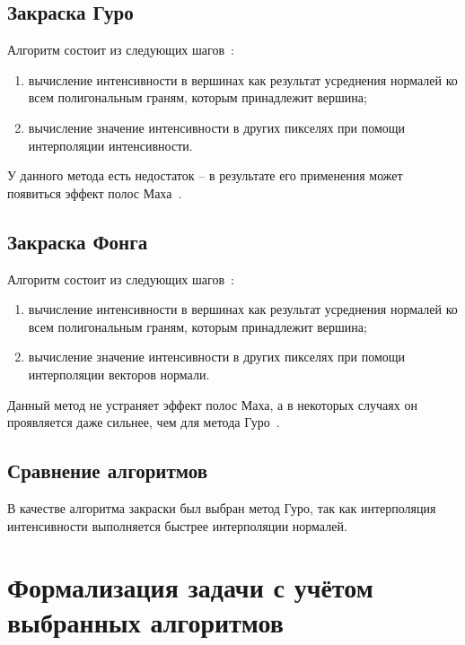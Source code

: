 \subsection{Закраска Гуро}

Алгоритм состоит из следующих шагов~\cite{gaf}:

\begin{enumerate}[label=\arabic*.]
	\item вычисление интенсивности в вершинах как результат усреднения нормалей ко всем полигональным граням, которым принадлежит вершина;
	\item вычисление значение интенсивности в других пикселях при помощи интерполяции интенсивности. 
\end{enumerate}

У данного метода есть недостаток -- в результате его применения может появиться эффект полос Маха~\cite{cannon}.

\subsection{Закраска Фонга}

Алгоритм состоит из следующих шагов~\cite{gaf}:

\begin{enumerate}[label=\arabic*.]
	\item вычисление интенсивности в вершинах как результат усреднения нормалей ко всем полигональным граням, которым принадлежит вершина;
	\item вычисление значение интенсивности в других пикселях при помощи интерполяции векторов нормали. 
\end{enumerate}

Данный метод не устраняет эффект полос Маха, а в некоторых случаях он проявляется даже сильнее, чем для метода Гуро~\cite{cannon}.

\subsection{Сравнение алгоритмов}

В качестве алгоритма закраски был выбран метод Гуро, так как интерполяция интенсивности выполняется быстрее интерполяции нормалей.

\section{Формализация задачи с учётом выбранных алгоритмов}

